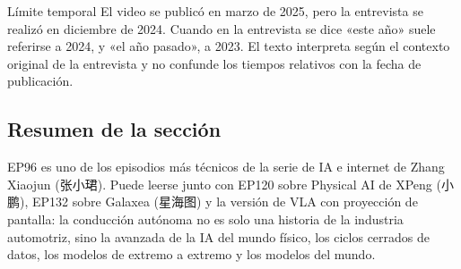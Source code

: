 \begin{warningbox}{Límite temporal}
El video se publicó en marzo de 2025, pero la entrevista se realizó en diciembre de 2024. Cuando en la entrevista se dice «este año» suele referirse a 2024, y «el año pasado», a 2023. El texto interpreta según el contexto original de la entrevista y no confunde los tiempos relativos con la fecha de publicación.
\end{warningbox}

\subsection{Resumen de la sección}

EP96 es uno de los episodios más técnicos de la serie de IA e internet de Zhang Xiaojun (张小珺). Puede leerse junto con EP120 sobre Physical AI de XPeng (小鹏), EP132 sobre Galaxea (星海图) y la versión de VLA con proyección de pantalla: la conducción autónoma no es solo una historia de la industria automotriz, sino la avanzada de la IA del mundo físico, los ciclos cerrados de datos, los modelos de extremo a extremo y los modelos del mundo.
